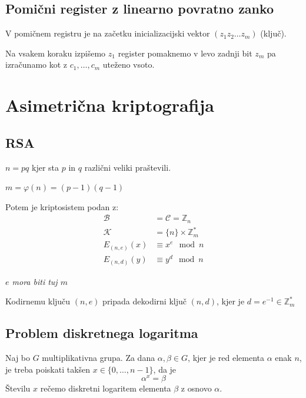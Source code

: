 \begin{multicols}{4}
\subsection*{Pomični register z linearno povratno zanko}
V pomičnem registru je na začetku inicializacijski vektor $(z_1 z_2 \dots z_m)$ (ključ).

Na vsakem koraku izpišemo $z_1$ register pomaknemo v levo zadnji bit $z_m$ pa 
izračunamo kot z $c_1, \dots, c_m$ uteženo vsoto.

\begin{center}
\end{center}

\section*{Asimetrična kriptografija}
\subsection*{RSA}
$n = pq$ kjer sta $p$ in $q$ različni veliki praštevili.

$m = \varphi(n) = (p-1)(q-1)$

Potem je kriptosistem podan z:
\begin{align*}
	\mathcal{B} &= \mathcal{C} = \mathbb{Z}_n \\
	\mathcal{K} &= \{n\} \times \mathbb{Z}_m^* \\
	E_{(n,e)}(x) &\equiv x^e \mod n \\
	E_{(n,d)}(y) &\equiv y^d \mod n
\end{align*}

\textit{$e$ mora biti tuj $m$}

Kodirnemu ključu $(n, e)$ pripada dekodirni ključ $(n, d)$, kjer je $d = e^{-1} \in \mathbb{Z}_m^*$

\subsection*{Problem diskretnega logaritma}
Naj bo $G$ multiplikativna grupa. Za dana $\alpha, \beta \in G$, kjer je red elementa $\alpha$ enak $n$, 
je treba poiskati takšen $x \in \{0, \dots, n-1\}$, da je
\[ \alpha^x = \beta\]
Številu $x$ rečemo diskretni logaritem elementa $\beta$ z osnovo $\alpha$.




\end{multicols}
